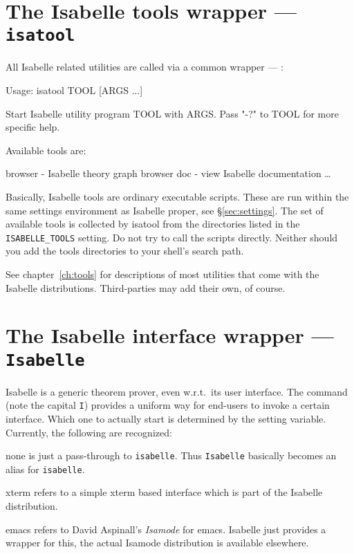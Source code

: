 \section{The Isabelle tools wrapper --- \texttt{isatool}} \label{sec:isatool}

All Isabelle related utilities are called via a common wrapper ---
:
\begin{ttbox}
Usage: isatool TOOL [ARGS ...]

  Start Isabelle utility program TOOL with ARGS. Pass "-?" to TOOL
  for more specific help.

  Available tools are:

    browser - Isabelle theory graph browser
    doc - view Isabelle documentation
    \dots
\end{ttbox}
Basically, Isabelle tools are ordinary executable scripts.  These are
run within the same settings environment as Isabelle proper, see
\S\ref{sec:settings}.  The set of available tools is collected by
isatool from the directories listed in the \texttt{ISABELLE_TOOLS}
setting.  Do not try to call the scripts directly. Neither should you
add the tools directories to your shell's search path.


\medskip See chapter~\ref{ch:tools} for descriptions of most utilities
that come with the Isabelle distributions. Third-parties may add their
own, of course.


\section{The Isabelle interface wrapper --- \texttt{Isabelle}} \label{sec:interface}

Isabelle is a generic theorem prover, even w.r.t.\ its user interface.
The  command (note the capital \texttt{I}) provides
a uniform way for end-users to invoke a certain interface. Which one
to actually start is determined by the 
setting variable. Currently, the following are recognized:
\begin{ttdescription}
\item[none] is just a pass-through to \texttt{isabelle}. Thus
  \texttt{Isabelle} basically becomes an alias for \texttt{isabelle}.
  
\item[xterm] refers to a simple xterm based interface which is part of
  the Isabelle distribution.
  
\item[emacs] refers to David Aspinall's \emph{Isamode} for emacs.
  Isabelle just provides a wrapper for this, the actual Isamode
  distribution is available elsewhere.
\end{ttdescription}

